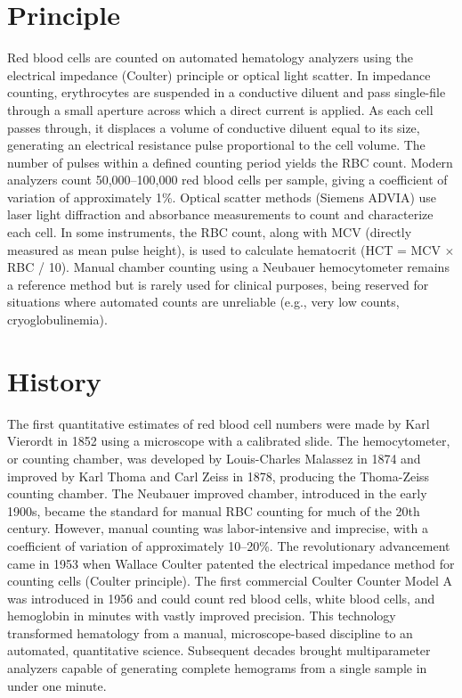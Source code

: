 \section*{Principle}
Red blood cells are counted on automated hematology analyzers using the electrical impedance (Coulter) principle or optical light scatter. In impedance counting, erythrocytes are suspended in a conductive diluent and pass single-file through a small aperture across which a direct current is applied. As each cell passes through, it displaces a volume of conductive diluent equal to its size, generating an electrical resistance pulse proportional to the cell volume. The number of pulses within a defined counting period yields the RBC count. Modern analyzers count 50,000--100,000 red blood cells per sample, giving a coefficient of variation of approximately 1\%. Optical scatter methods (Siemens ADVIA) use laser light diffraction and absorbance measurements to count and characterize each cell. In some instruments, the RBC count, along with MCV (directly measured as mean pulse height), is used to calculate hematocrit (HCT = MCV $\times$ RBC / 10). Manual chamber counting using a Neubauer hemocytometer remains a reference method but is rarely used for clinical purposes, being reserved for situations where automated counts are unreliable (e.g., very low counts, cryoglobulinemia).

\section*{History}
The first quantitative estimates of red blood cell numbers were made by Karl Vierordt in 1852 using a microscope with a calibrated slide. The hemocytometer, or counting chamber, was developed by Louis-Charles Malassez in 1874 and improved by Karl Thoma and Carl Zeiss in 1878, producing the Thoma-Zeiss counting chamber. The Neubauer improved chamber, introduced in the early 1900s, became the standard for manual RBC counting for much of the 20th century. However, manual counting was labor-intensive and imprecise, with a coefficient of variation of approximately 10--20\%. The revolutionary advancement came in 1953 when Wallace Coulter patented the electrical impedance method for counting cells (Coulter principle). The first commercial Coulter Counter Model A was introduced in 1956 and could count red blood cells, white blood cells, and hemoglobin in minutes with vastly improved precision. This technology transformed hematology from a manual, microscope-based discipline to an automated, quantitative science. Subsequent decades brought multiparameter analyzers capable of generating complete hemograms from a single sample in under one minute.

